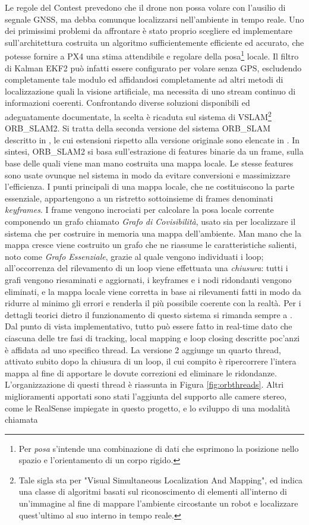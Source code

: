 \indent Le regole del Contest prevedono che il drone non possa volare con l'ausilio di segnale GNSS, ma debba comunque localizzarsi nell'ambiente in tempo reale. Uno dei primissimi problemi da affrontare è stato proprio scegliere ed implementare sull'architettura costruita un algoritmo sufficientemente efficiente ed accurato, che potesse fornire a PX4 una stima attendibile e regolare della posa\footnote{Per \emph{posa} s'intende una combinazione di dati che esprimono la posizione nello spazio e l'orientamento di un corpo rigido.} locale. Il filtro di Kalman EKF2 può infatti essere configurato per volare senza GPS, escludendo completamente tale modulo ed affidandosi completamente ad altri metodi di localizzazione quali la visione artificiale, ma necessita di uno stream continuo di informazioni coerenti. Confrontando diverse soluzioni disponibili ed adeguatamente documentate, la scelta è ricaduta sul sistema di VSLAM\footnote{Tale sigla sta per "Visual Simultaneous Localization And Mapping", ed indica una classe di algoritmi basati sul riconoscimento di elementi all'interno di un'immagine al fine di mappare l'ambiente circostante un robot e localizzare quest'ultimo al suo interno in tempo reale.} ORB\_SLAM2. Si tratta della seconda versione del sistema ORB\_SLAM descritto in \cite{orbslam}, le cui estensioni rispetto alla versione originale sono elencate in \cite{orbslam2}. In sintesi, ORB\_SLAM2 si basa sull'estrazione di features binarie da un frame, sulla base delle quali viene man mano costruita una mappa locale. Le stesse features sono usate ovunque nel sistema in modo da evitare conversioni e massimizzare l'efficienza. I punti principali di una mappa locale, che ne costituiscono la parte essenziale, appartengono a un ristretto sottoinsieme di frames denominati \emph{keyframes}. I frame vengono incrociati per calcolare la posa locale corrente componendo un grafo chiamato \emph{Grafo di Covisibilità}, usato sia per localizzare il sistema che per costruire in memoria una mappa dell'ambiente. Man mano che la mappa cresce viene costruito un grafo che ne riassume le caratteristiche salienti, noto come \emph{Grafo Essenziale}, grazie al quale vengono individuati i loop; all'occorrenza del rilevamento di un loop viene effettuata una \emph{chiusura}: tutti i grafi vengono riesaminati e aggiornati, i keyframes e i nodi ridondanti vengono eliminati, e la mappa locale viene corretta in base ai rilevamenti fatti in modo da ridurre al minimo gli errori e renderla il più possibile coerente con la realtà. Per i dettagli teorici dietro il funzionamento di questo sistema si rimanda sempre a \cite{orbslam}. Dal punto di vista implementativo, tutto può essere fatto in real-time dato che ciascuna delle tre fasi di tracking, local mapping e loop closing descritte poc'anzi è affidata ad uno specifico thread. La versione 2 aggiunge un quarto thread, attivato subito dopo la chiusura di un loop, il cui compito è ripercorrere l'intera mappa al fine di apportare le dovute correzioni ed eliminare le ridondanze. L'organizzazione di questi thread è riassunta in Figura \ref{fig:orbthreads}. Altri miglioramenti apportati sono stati l'aggiunta del supporto alle camere stereo, come le RealSense impiegate in questo progetto, e lo sviluppo di una modalità chiamata 